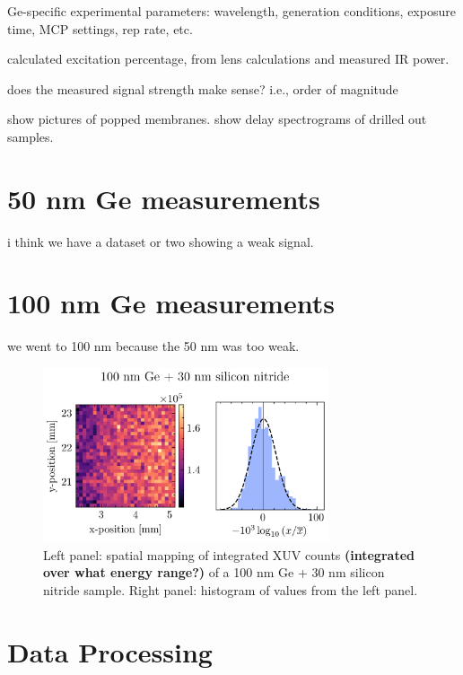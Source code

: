Ge-specific experimental parameters: wavelength, generation conditions, exposure time, MCP settings, rep rate, etc.

calculated excitation percentage, from lens calculations and measured IR power.

does the measured signal strength make sense? i.e., order of magnitude

show pictures of popped membranes. show delay spectrograms of drilled out samples.

\section{50 nm Ge measurements}
i think we have a dataset or two showing a weak signal.


\section{100 nm Ge measurements}
we went to 100 nm because the 50 nm was too weak.

\begin{figure}
	\centering
	\includegraphics[width=0.75\textwidth]{figures/chap3/Ge_map.png}
	\caption{Left panel: spatial mapping of integrated XUV counts \textbf{(integrated over what energy range?)} of a 100 nm Ge + 30 nm silicon nitride sample. Right panel: histogram of values from the left panel.}
	\label{fig:Ge_map}
\end{figure}

\section{Data Processing}

